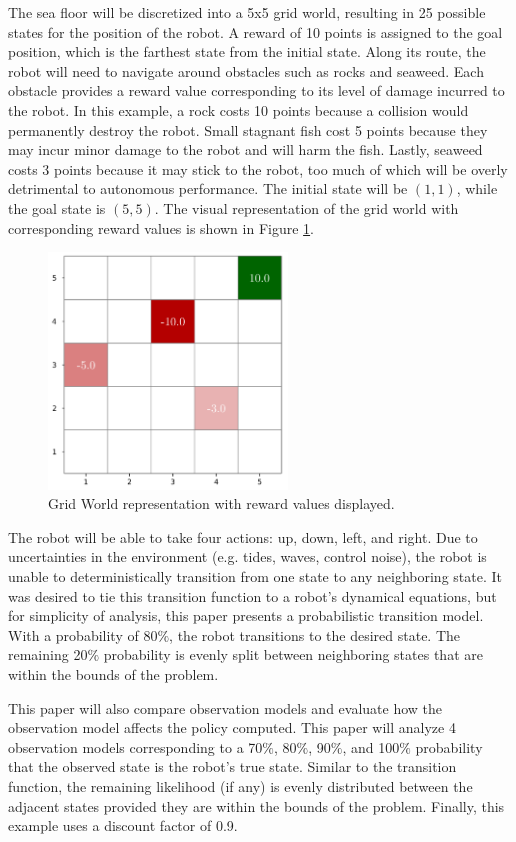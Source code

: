 \documentclass{article}
\begin{document}
  The sea floor will be discretized into a 5x5 grid world, resulting in 25 possible states for the position of the robot. A reward of 10 points is assigned to the goal position, which is the farthest state from the initial state. Along its route, the robot will need to navigate around obstacles such as rocks and seaweed. Each obstacle provides a reward value corresponding to its level of damage incurred to the robot. In this example, a rock costs 10 points because a collision would permanently destroy the robot.  Small stagnant fish cost 5 points because they may incur minor damage to the robot and will harm the fish. Lastly, seaweed costs 3 points because it may stick to the robot, too much of which will be overly detrimental to autonomous performance.  The initial state will be $(1, 1)$, while the goal state is $(5, 5)$. The visual representation of the grid world with corresponding reward values is shown in Figure \ref{fig:gridworld}.

\begin{figure}
    \centering
    \includegraphics[width=2.5in]{gridworld.png}
    \caption{Grid World representation with reward values displayed.}
    \label{fig:gridworld}
\end{figure}

The robot will be able to take four actions: up, down, left, and right. Due to uncertainties in the environment (e.g. tides, waves, control noise), the robot is unable to deterministically transition from one state to any neighboring state. It was desired to tie this transition function to a robot's dynamical equations, but for simplicity of analysis, this paper presents a probabilistic transition model. With a probability of 80$\%$, the robot transitions to the desired state.  The remaining 20$\%$ probability is evenly split between neighboring states that are within the bounds of the problem.
  
This paper will also compare observation models and evaluate how the observation model affects the policy computed.  This paper will analyze 4 observation models corresponding to a 70$\%$, 80$\%$, 90$\%$, and 100$\%$ probability that the observed state is the robot's true state.  Similar to the transition function, the remaining likelihood (if any) is evenly distributed between the adjacent states provided they are within the bounds of the problem. Finally, this example uses a discount factor of 0.9.
\end{document}
